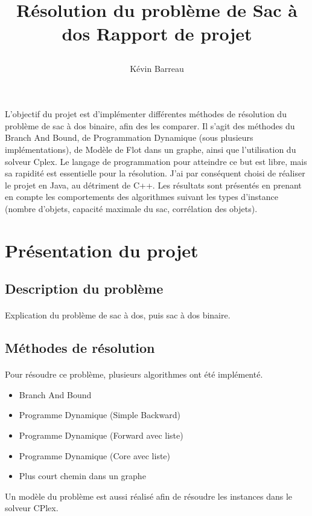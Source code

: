 \documentclass[12pt]{article}
\title{
 \begin{minipage}\linewidth
        \centering
        Résolution du problème de Sac à dos 
        \vskip3pt
        \large Rapport de projet
    \end{minipage}
 }
\author{Kévin Barreau}
\begin{document}
\maketitle

\abstract
L'objectif du projet est d'implémenter différentes méthodes de résolution du problème de sac à dos binaire, afin des les comparer. Il s'agit des méthodes du Branch And Bound, de Programmation Dynamique (sous plusieurs implémentations), de Modèle de Flot dans un graphe, ainsi que l'utilisation du solveur Cplex. Le langage de programmation pour atteindre ce but est libre, mais sa rapidité est essentielle pour la résolution. J'ai par conséquent choisi de réaliser le projet en Java, au détriment de C++. Les résultats sont présentés en prenant en compte les comportements des algorithmes suivant les types d'instance (nombre d'objets, capacité maximale du sac, corrélation des objets).

\newpage

\renewcommand{\contentsname}{Sommaire} 
\tableofcontents

\newpage

\section{Présentation du projet}

\subsection{Description du problème}

\paragraph{}Explication du problème de sac à dos, puis sac à dos binaire.

\subsection{Méthodes de résolution}

\paragraph{}Pour résoudre ce problème, plusieurs algorithmes ont été implémenté.
\begin{itemize}
	\item Branch And Bound
	\item Programme Dynamique (Simple Backward)
	\item Programme Dynamique (Forward avec liste)
	\item Programme Dynamique (Core avec liste)
	\item Plus court chemin dans un graphe
\end{itemize}
Un modèle du problème est aussi réalisé afin de résoudre les instances dans le solveur CPlex.
\end{document}
